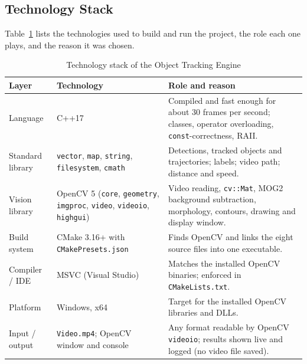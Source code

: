 \documentclass[12pt,a4paper,oneside]{book}
\begin{document}
\subsection{Technology Stack}
Table~\ref{tab:stack} lists the technologies used to build and run the project, the role each one plays, and the reason it was chosen.

\begin{table}[H]
\centering
\caption{Technology stack of the Object Tracking Engine}
\label{tab:stack}
\footnotesize
\begin{tabular}{@{}p{2.7cm}p{4.2cm}p{8.1cm}@{}}
\toprule
\textbf{Layer} & \textbf{Technology} & \textbf{Role and reason}\\
\midrule
Language & C++17 & Compiled and fast enough for about 30 frames per second; classes, operator overloading, \texttt{const}-correctness, RAII.\\
Standard library & \texttt{vector}, \texttt{map}, \texttt{string}, \texttt{filesystem}, \texttt{cmath} & Detections, tracked objects and trajectories; labels; video path; distance and speed.\\
Vision library & OpenCV 5 (\texttt{core}, \texttt{geometry}, \texttt{imgproc}, \texttt{video}, \texttt{videoio}, \texttt{highgui}) & Video reading, \texttt{cv::Mat}, MOG2 background subtraction, morphology, contours, drawing and display window.\\
Build system & CMake 3.16+ with \texttt{CMakePresets.json} & Finds OpenCV and links the eight source files into one executable.\\
Compiler / IDE & MSVC (Visual Studio) & Matches the installed OpenCV binaries; enforced in \texttt{CMakeLists.txt}.\\
Platform & Windows, x64 & Target for the installed OpenCV libraries and DLLs.\\
Input / output & \texttt{Video.mp4}; OpenCV window and console & Any format readable by OpenCV \texttt{videoio}; results shown live and logged (no video file saved).\\
\bottomrule
\end{tabular}
\end{table}

\end{document}
